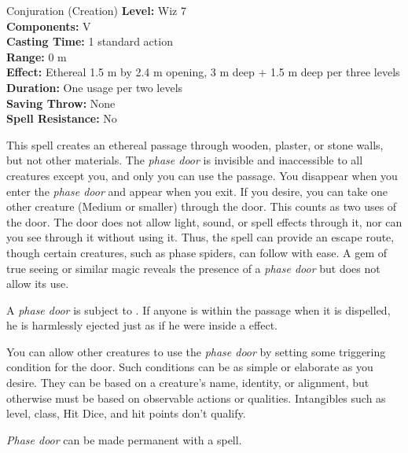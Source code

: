 {Conjuration (Creation)}
{
	\textbf{Level:}
	Wiz 7\\
	\textbf{Components:}
	V\\
	\textbf{Casting Time:}
	1 standard action\\
	\textbf{Range:}
	0 m\\
	\textbf{Effect:}
	Ethereal 1.5 m by 2.4 m opening, 3 m deep + 1.5 m deep per three levels\\
	\textbf{Duration:}
	One usage per two levels\\
	\textbf{Saving Throw:}
	None\\
	\textbf{Spell Resistance:}
	No\\
}
{
	This spell creates an ethereal passage through wooden, plaster, or stone walls, but not other materials. The \emph{phase door} is invisible and inaccessible to all creatures except you, and only you can use the passage. You disappear when you enter the \emph{phase door} and appear when you exit. If you desire, you can take one other creature (Medium or smaller) through the door. This counts as two uses of the door. The door does not allow light, sound, or spell effects through it, nor can you see through it without using it. Thus, the spell can provide an escape route, though certain creatures, such as phase spiders, can follow with ease. A gem of true seeing or similar magic reveals the presence of a \emph{phase door} but does not allow its use.

	A \emph{phase door} is subject to . If anyone is within the passage when it is dispelled, he is harmlessly ejected just as if he were inside a  effect.

	You can allow other creatures to use the \emph{phase door} by setting some triggering condition for the door. Such conditions can be as simple or elaborate as you desire. They can be based on a creature's name, identity, or alignment, but otherwise must be based on observable actions or qualities. Intangibles such as level, class, Hit Dice, and hit points don't qualify.

	\emph{Phase door} can be made permanent with a  spell.

}
